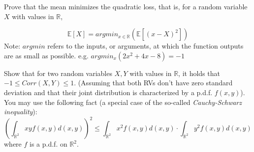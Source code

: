 \documentclass[a4 paper]{article}
\begin{document}
 Prove that the mean minimizes the quadratic loss, that is, for a random variable $X$ with values in $\mathbb{R}$,

\begin{equation*}
    \mathbb{E}[X]=argmin_{x \in \mathbb{R}} (\mathbb{E}[(x-X)^2])
\end{equation*}
Note: $argmin$ refers to the inputs, or arguments, at which the function outputs are as small as possible. e.g. $argmin_x(2x^2+4x-8)=-1$

 Show that for two random variables $X, Y$ with values in $\mathbb{R}$, it holds that $-1\leq Corr(X,Y) \leq 1$. (Assuming that both RVs don't have zero standard deviation and that their joint distribution is characterized by a p.d.f. $f(x,y)$). You may use the following fact (a special case of the so-called \textit{Cauchy-Schwarz inequality}):
\begin{equation*}
    (\int_{\mathbb{R}^2} xy f(x,y) d(x,y) )^2 \leq \int_{\mathbb{R}^2} x^2 f(x,y) d(x,y) \cdot \int_{\mathbb{R}^2} y^2 f(x,y) d(x,y)
\end{equation*}
where $f$ is a p.d.f. on $\mathbb{R}^2$.
\end{document}

